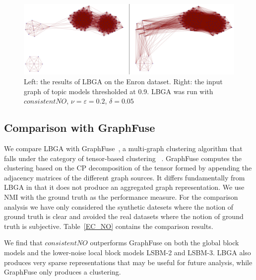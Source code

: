 \documentclass{IEEEtran}
\begin{document}
\begin{figure}[t]
\begin{centering}
\includegraphics[width=\columnwidth]{figures/enron-comparison.pdf}
\par\end{centering}
\caption{Left: the results of LBGA on the Enron dataset. Right: the input graph
of topic models thresholded at 0.9. LBGA was run with $consistentNO$, $\nu =
\varepsilon = 0.2$, $\delta = 0.05$} 
\label{fig:enron-comparison}
\end{figure}


\subsection{Comparison with GraphFuse}
We compare LBGA with GraphFuse~\cite{Papalexakis2013}, a multi-graph clustering
algorithm that falls under the category of tensor-based clustering
~\cite{kolda2009,Tang2009}. GraphFuse computes the clustering based on
the CP decomposition of the tensor formed by appending the adjacency matrices
of the different graph sources. It differs fundamentally from LBGA in that it
does not produce an aggregated graph representation. We use NMI with the
ground truth as the performance measure. For the comparison analysis we have
only considered the synthetic datesets where the notion of ground truth is
clear and avoided the real datasets where the notion of ground truth is
subjective. Table~\ref{EC_NO} contains the comparison results. 

We find that $consistentNO$ outperforms GraphFuse on both the global block
models and the lower-noise local block models LSBM-2 and LSBM-3. LBGA also
produces very sparse representations that may be useful for future analysis,
while GraphFuse only produces a clustering.
\end{document}
